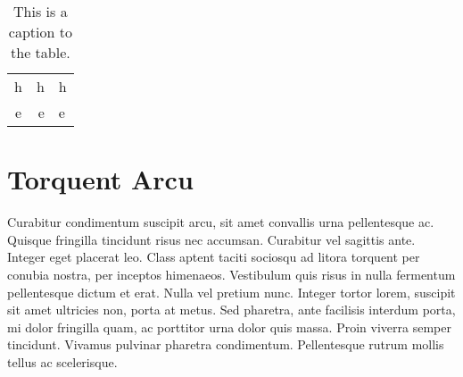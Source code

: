 \begin{table}
    \centering
        \begin{tabular}{c | r l}
            h & h & h \\
            e & e & e \\
        \end{tabular}
    \caption{This is a caption to the table.}
    \label{myTable}
\end{table}

\section{Torquent Arcu}
Curabitur condimentum suscipit arcu, sit amet convallis urna pellentesque ac. Quisque fringilla tincidunt risus nec accumsan. Curabitur vel sagittis ante. Integer eget placerat leo. Class aptent taciti sociosqu ad litora torquent per conubia nostra, per inceptos himenaeos. Vestibulum quis risus in nulla fermentum pellentesque dictum et erat. Nulla vel pretium nunc. Integer tortor lorem, suscipit sit amet ultricies non, porta at metus. Sed pharetra, ante facilisis interdum porta, mi dolor fringilla quam, ac porttitor urna dolor quis massa. Proin viverra semper tincidunt. Vivamus pulvinar pharetra condimentum. Pellentesque rutrum mollis tellus ac scelerisque.

